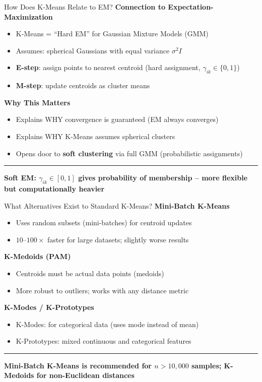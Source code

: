 \documentclass[8pt,aspectratio=169]{beamer}
\newcommand{\bottomnote}[1]{%
\vfill
\vspace{-2mm}
\textcolor{mllavender2}{\rule{\textwidth}{0.4pt}}
\vspace{1mm}
\footnotesize
\textbf{#1}
}
\begin{document}
\begin{frame}[t]{How Does K-Means Relate to EM?}
\textbf{Connection to Expectation-Maximization}
\begin{itemize}
\item K-Means = ``Hard EM'' for Gaussian Mixture Models (GMM)
\item Assumes: spherical Gaussians with equal variance $\sigma^2 I$
\item \textbf{E-step}: assign points to nearest centroid (hard assignment, $\gamma_{ik} \in \{0,1\}$)
\item \textbf{M-step}: update centroids as cluster means
\end{itemize}
\vspace{0.5em}
\textbf{Why This Matters}
\begin{itemize}
\item Explains WHY convergence is guaranteed (EM always converges)
\item Explains WHY K-Means assumes spherical clusters
\item Opens door to \textbf{soft clustering} via full GMM (probabilistic assignments)
\end{itemize}
\bottomnote{Soft EM: $\gamma_{ik} \in [0,1]$ gives probability of membership -- more flexible but computationally heavier}
\end{frame}

\begin{frame}[t]{What Alternatives Exist to Standard K-Means?}
\textbf{Mini-Batch K-Means}
\begin{itemize}
\item Uses random subsets (mini-batches) for centroid updates
\item $10$--$100\times$ faster for large datasets; slightly worse results
\end{itemize}
\vspace{0.3em}
\textbf{K-Medoids (PAM)}
\begin{itemize}
\item Centroids must be actual data points (medoids)
\item More robust to outliers; works with any distance metric
\end{itemize}
\vspace{0.3em}
\textbf{K-Modes / K-Prototypes}
\begin{itemize}
\item K-Modes: for categorical data (uses mode instead of mean)
\item K-Prototypes: mixed continuous and categorical features
\end{itemize}
\bottomnote{Mini-Batch K-Means is recommended for $n > 10{,}000$ samples; K-Medoids for non-Euclidean distances}
\end{frame}
\end{document}
